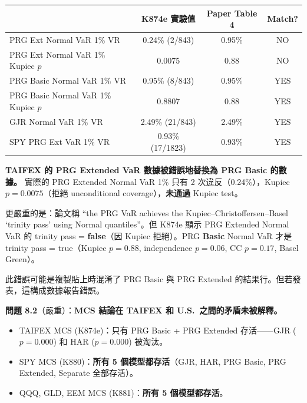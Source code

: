 \documentclass[12pt,a4paper]{article}
\begin{document}
\begin{center}
\small
\begin{tabular}{lccc}
\toprule
& \textbf{K874e 實驗值} & \textbf{Paper Table 4} & \textbf{Match?} \\
\midrule
PRG Ext Normal VaR 1\% VR & 0.24\% (2/843) & 0.95\% & \textcolor{errorred}{NO} \\
PRG Ext Normal VaR 1\% Kupiec $p$ & 0.0075 & 0.88 & \textcolor{errorred}{NO} \\
PRG Basic Normal VaR 1\% VR & 0.95\% (8/843) & 0.95\% & \textcolor{okgreen}{YES} \\
PRG Basic Normal VaR 1\% Kupiec $p$ & 0.8807 & 0.88 & \textcolor{okgreen}{YES} \\
GJR Normal VaR 1\% VR & 2.49\% (21/843) & 2.49\% & \textcolor{okgreen}{YES} \\
SPY PRG Ext VaR 1\% VR & 0.93\% (17/1823) & 0.93\% & \textcolor{okgreen}{YES} \\
\bottomrule
\end{tabular}
\end{center}

\textbf{TAIFEX 的 PRG Extended VaR 數據被錯誤地替換為 PRG Basic 的數據。} 實際的 PRG Extended Normal VaR 1\% 只有 2 次違反（0.24\%），Kupiec $p = 0.0075$（拒絕 unconditional coverage），\textbf{未通過} Kupiec test。

更嚴重的是：論文稱 ``the PRG VaR achieves the Kupiec--Christoffersen--Basel `trinity pass' using Normal quantiles''。但 K874e 顯示 PRG Extended Normal VaR 的 trinity pass = \textbf{false}（因 Kupiec 拒絕）。PRG \textbf{Basic} Normal VaR 才是 trinity pass = true（Kupiec $p=0.88$, independence $p=0.06$, CC $p=0.17$, Basel Green）。

此錯誤可能是複製貼上時混淆了 PRG Basic 與 PRG Extended 的結果行。但若發表，這構成數據報告錯誤。

\textbf{問題 8.2}（\textcolor{errorred}{嚴重}）：\textbf{MCS 結論在 TAIFEX 和 U.S.\ 之間的矛盾未被解釋。}

\begin{itemize}
    \item TAIFEX MCS (K874e)：只有 PRG Basic + PRG Extended 存活——GJR ($p=0.000$) 和 HAR ($p=0.000$) 被淘汰。
    \item SPY MCS (K880)：\textbf{所有 5 個模型都存活}（GJR, HAR, PRG Basic, PRG Extended, Separate 全部存活）。
    \item QQQ, GLD, EEM MCS (K881)：\textbf{所有 5 個模型都存活}。
\end{itemize}
\end{document}
